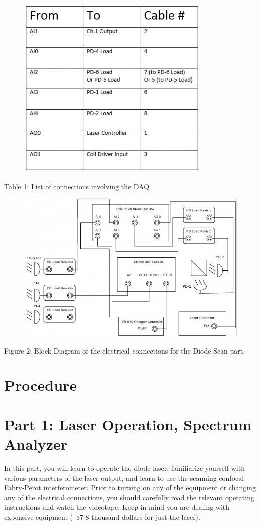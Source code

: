 \documentclass{../lab}
\begin{document}
\begin{figure}[h]
    \centering
    \href{http://experimentationlab.berkeley.edu/sites/default/files/images/350px-Connectionchart.jpg}{\includegraphics[width=0.5\linewidth]{images/350px-Connectionchart.jpg}}
    \caption{}
    \label{fig:350px-Connectionchart}
\end{figure}

Table 1: List of connections involving the DAQ\begin{figure}[h]
    \centering
    \href{http://experimentationlab.berkeley.edu/sites/default/files/images/MNOfigure2.jpg}{\includegraphics[width=0.5\linewidth]{images/MNOfigure2.jpg}}
    \caption{}
    \label{fig:MNOfigure2}
\end{figure}


Figure 2: Block Diagram of the electrical connections for the Diode Scan part.\section{Procedure}

\section{Part 1: Laser Operation, Spectrum Analyzer}

In this part, you will learn to operate the diode laser, familiarize yourself with various parameters of the laser output, and learn to use the scanning confocal Fabry-Perot interferometer. Prior to turning on any of the equipment or changing any of the electrical connections, you should carefully read the relevant operating instructions and watch the videotape. Keep in mind you are dealing with expensive equipment (~\$7-8 thousand dollars for just the laser).
\end{document}
